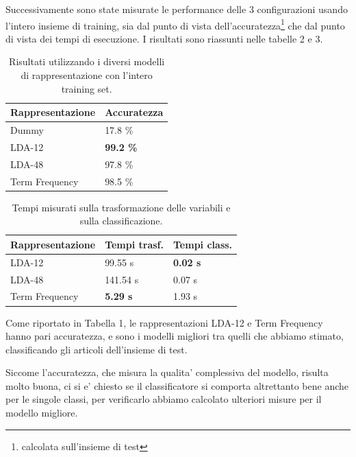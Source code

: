 \documentclass[runningheads]{llncs}
\begin{document}
Successivamente sono state misurate le performance delle 3 configurazioni usando l'intero insieme di training, sia dal punto di vista dell'accuratezza\footnote{calcolata sull'insieme di test} che dal punto di vista dei tempi di esecuzione. I risultati sono riassunti nelle tabelle 2 e 3.

\begin{table}[]
    \centering
\begin{tabular}{ll}
\hline
Rappresentazione & Accuratezza      \\ \hline
Dummy            & 17.8 \%          \\
LDA-12           & \textbf{99.2 \%} \\
LDA-48           & 97.8 \%          \\
Term Frequency   & 98.5 \% \\ \hline
\end{tabular}
    \caption{Risultati utilizzando i diversi modelli di rappresentazione con l'intero training set.}%
\end{table}

\begin{table}[]
    \centering
\begin{tabular}{lll}
\hline
Rappresentazione & Tempi trasf. & Tempi class. \\ \hline
LDA-12           & 99.55 s & \textbf{0.02 s} \\
LDA-48           & 141.54 s & 0.07 s   \\
Term Frequency   & \textbf{5.29 s} & 1.93 s \\ \hline
\end{tabular}
    \caption{Tempi misurati sulla trasformazione delle variabili e sulla classificazione.}%
\end{table}


Come riportato in Tabella 1, le rappresentazioni LDA-12 e Term Frequency hanno pari accuratezza, e sono i modelli migliori tra quelli che abbiamo stimato, classificando gli articoli dell'insieme di test.



Siccome l'accuratezza, che misura la qualita' complessiva del modello, risulta molto buona, ci si e' chiesto se il classificatore si comporta altrettanto bene anche per le singole classi, per verificarlo abbiamo calcolato ulteriori misure per il modello migliore.


%
\end{document}
